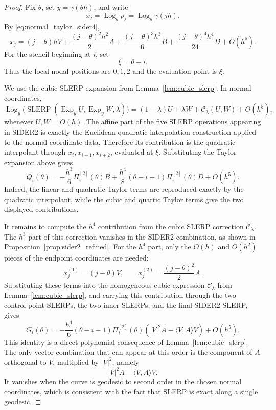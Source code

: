 \documentclass[a4paper,11pt]{article}
\newcommand{\Log}{\operatorname{Log}}
\newcommand{\Exp}{\operatorname{Exp}}
\newcommand{\SLERP}{\operatorname{SLERP}}
\numberwithin{equation}{section}
\begin{document}
\begin{proof}
Fix \(\theta\), set \(y=\gamma(\theta h)\), and write
\[
        x_j=\Log_y p_j=\Log_y\gamma(jh).
\]
By \eqref{eq:normal_taylor_sider4},
\[
        x_j
        =
        (j-\theta)hV
        +
        \frac{(j-\theta)^2h^2}{2}A
        +
        \frac{(j-\theta)^3h^3}{6}B
        +
        \frac{(j-\theta)^4h^4}{24}D
        +
        O(h^5).
\]
For the stencil beginning at \(i\), set
\[
        \xi=\theta-i.
\]
Thus the local nodal positions are \(0,1,2\) and the evaluation point is
\(\xi\).

We use the cubic SLERP expansion from Lemma~\ref{lem:cubic_slerp}.  In normal
coordinates,
\[
\Log_y\bigl(\SLERP(\Exp_y U,\Exp_y W,\lambda)\bigr)
=
(1-\lambda)U+\lambda W+\mathcal C_\lambda(U,W)+O(h^5),
\]
whenever \(U,W=O(h)\).  The affine part of the five SLERP operations appearing
in SIDER2 is exactly the Euclidean quadratic interpolation construction
applied to the normal-coordinate data.  Therefore its contribution is the
quadratic interpolant through \(x_i,x_{i+1},x_{i+2}\), evaluated at \(\xi\).
Substituting the Taylor expansion above gives
\begin{equation}
\label{eq:sider2_affine_part_h4}
Q_i(\theta)
=
-\frac{h^3}{6}\Pi_i^{[2]}(\theta)B
+
\frac{h^4}{8}
(\theta-i-1)\Pi_i^{[2]}(\theta)D
+
O(h^5).
\end{equation}
Indeed, the linear and quadratic Taylor terms are reproduced exactly by the
quadratic interpolant, while the cubic and quartic Taylor terms give the two
displayed contributions.

It remains to compute the \(h^4\) contribution from the cubic SLERP correction
\(\mathcal C_\lambda\).  The \(h^3\) part of this correction vanishes in the
SIDER2 combination, as shown in Proposition~\ref{prop:sider2_refined}.  For
the \(h^4\) part, only the \(O(h)\) and \(O(h^2)\) pieces of the endpoint
coordinates are needed:
\[
        x_j^{(1)}=(j-\theta)V,
        \qquad
        x_j^{(2)}=\frac{(j-\theta)^2}{2}A .
\]
Substituting these terms into the homogeneous cubic expression
\(\mathcal C_\lambda\) from Lemma~\ref{lem:cubic_slerp}, and carrying this
contribution through the two control-point SLERPs, the two inner SLERPs, and
the final SIDER2 SLERP, gives
\begin{equation}
\label{eq:sider2_curvature_part_h4}
G_i(\theta)
=
-\frac{h^4}{6}
(\theta-i-1)\Pi_i^{[2]}(\theta)
\left(|V|^2A-\langle V,A\rangle V\right)
+
O(h^5).
\end{equation}
This identity is a direct polynomial consequence of
Lemma~\ref{lem:cubic_slerp}.  The only vector combination that can appear at
this order is the component of \(A\) orthogonal to \(V\), multiplied by
\(|V|^2\), namely
\[
        |V|^2A-\langle V,A\rangle V.
\]
It vanishes when the curve is geodesic to second order in the chosen normal
coordinates, which is consistent with the fact that SLERP is exact along a
single geodesic.


\end{proof}
\end{document}
